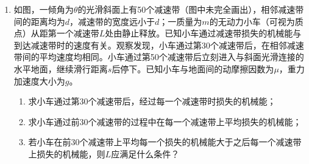 \documentclass[\gkver]{gaokaozhenti}
\begin{document}
\begin{enumerate}
{则需要描绘小灯泡在 $0\sim300\UmA$ 的伏安特性曲线，即 $R_{0}$ 应选取阻值为 $10\UO$；

（2）为了保护电路，滑动变阻器的滑片应置于变阻器的a端；

（3）由图可知当流过电流表的电流为 $10\UmA$ 时，电压为 $7\UmV$，则小灯泡的电阻为

$R=\frac{7\times10^{-3}}{10\times10^{-3}}\UO=0.7\UO$

（4）由题知电压表满量程时对应于小灯泡两端的电压为 $3\UV$ 时，有

$\frac{3}{R_{2}+R_{V}}=\frac{0.3}{R_{V}}$

解得 $R_{2}=2700\UO$

（5）由图（b）和表格可知流过小灯泡电流增加，图像中 $\frac{U}{I}$ 变大，则灯丝的电阻增大；

（6）根据表格可知当电流为 $160\UmA$ 时，电压表的示数为 $46\UmV$，根据（4）的分析可知此时小灯泡两端电压为 $0.46\UV$，则此时小灯泡电功率

$W_{1}=0.46\UV\times0.16\UA\approx0.074\UW$

同理可知当流过电流表的电流为 $300\UmA$ 时，小灯泡两端电压为 $2.5\UV$，此时小灯泡电功率 $W_{2}=2.5\UV\times0.3\UA=0.75\UW$

故有 $\frac{W_{2}}{W_{1}}=\frac{0.75}{0.074}=10$
}

\item
如图，一倾角为$\theta$的光滑斜面上有50个减速带（图中未完全画出），相邻减速带间的距离均为$d$，减速带的宽度远小于$d$；一质量为$m$的无动力小车（可视为质点）从距第一个减速带$L$处由静止释放。已知小车通过减速带损失的机械能与到达减速带时的速度有关。观察发现，小车通过第30个减速带后，在相邻减速带间的平均速度均相同。小车通过第50个减速带后立刻进入与斜面光滑连接的水平地面，继续滑行距离$s$后停下。已知小车与地面间的动摩擦因数为$\mu$，重力加速度大小为$g$。

\begin{enumerate}
	\item
	求小车通过第30个减速带后，经过每一个减速带时损失的机械能；

	\item
	求小车通过前30个减速带的过程中在每一个减速带上平均损失的机械能；

	\item
	若小车在前30个减速带上平均每一个损失的机械能大于之后每一个减速带上损失的机械能，则$L$应满足什么条件？
\end{enumerate}


\end{enumerate}
\end{document}
